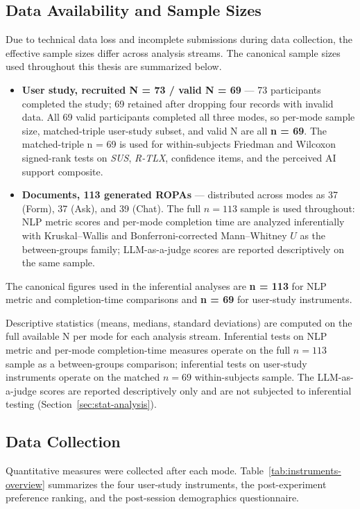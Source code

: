 \subsection{Data Availability and Sample Sizes}
Due to technical data loss and incomplete submissions during data collection, the effective sample sizes differ across analysis streams. The canonical sample sizes used throughout this thesis are summarized below.
\begin{itemize}\sloppy
    \item \textbf{User study, recruited N = 73 / valid N = 69} — 73 participants completed the study; 69 retained after dropping four records with invalid data. All 69 valid participants completed all three modes, so per-mode sample size, matched-triple user-study subset, and valid N are all \textbf{n = 69}. The matched-triple n = 69 is used for within-subjects Friedman and Wilcoxon signed-rank tests on \textit{SUS}, \textit{R-TLX}, confidence items, and the perceived AI support composite.
    \item \textbf{Documents, 113 generated ROPAs} — distributed across modes as 37 (Form), 37 (Ask), and 39 (Chat). The full $n = 113$ sample is used throughout: NLP metric scores and per-mode completion time are analyzed inferentially with Kruskal--Wallis and Bonferroni-corrected Mann--Whitney $U$ as the between-groups family; LLM-as-a-judge scores are reported descriptively on the same sample.
\end{itemize}
The canonical figures used in the inferential analyses are \textbf{n = 113} for NLP metric and completion-time comparisons and \textbf{n = 69} for user-study instruments.

Descriptive statistics (means, medians, standard deviations) are computed on the full available N per mode for each analysis stream. Inferential tests on NLP metric and per-mode completion-time measures operate on the full $n = 113$ sample as a between-groups comparison; inferential tests on user-study instruments operate on the matched $n = 69$ within-subjects sample. The LLM-as-a-judge scores are reported descriptively only and are not subjected to inferential testing (Section~\ref{sec:stat-analysis}).

\subsection{Data Collection}

Quantitative measures were collected after each mode. Table~\ref{tab:instruments-overview} summarizes the four user-study instruments, the post-experiment preference ranking, and the post-session demographics questionnaire.

